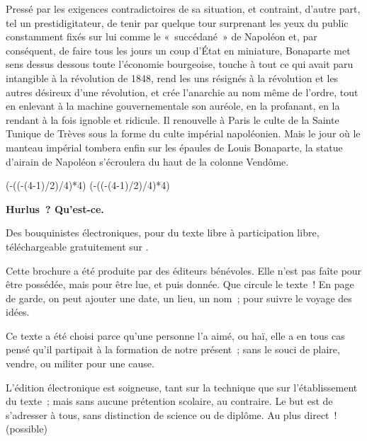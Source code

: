 \documentclass[french,twoside]{book} %
\newcommand\chapterclose{} %
\def\truncdiv#1#2{((#1-(#2-1)/2)/#2)}
\def\moduloop#1#2{(#1-\truncdiv{#1}{#2}*#2)}
\def\modulo#1#2{\number\numexpr\moduloop{#1}{#2}\relax}
\begin{document}
Pressé par les exigences contradictoires de sa situation, et contraint, d’autre part, tel un prestidigitateur, de tenir par quelque tour surprenant les yeux du public constamment fixés sur lui comme le « succédané » de Napoléon et, par conséquent, de faire tous les jours un coup d’État en miniature, Bonaparte met sens dessus dessous toute l’économie bourgeoise, touche à tout ce qui avait paru intangible à la révolution de 1848, rend les uns résignés à la révolution et les autres désireux d’une révolution, et crée l’anarchie au nom même de l’ordre, tout en enlevant à la machine gouvernementale son auréole, en la profanant, en la rendant à la fois ignoble et ridicule. Il renouvelle à Paris le culte de la Sainte Tunique de Trèves sous la forme du culte impérial napoléonien. Mais le jour où le manteau impérial tombera enfin sur les épaules de Louis Bonaparte, la statue d’airain de Napoléon s’écroulera du haut de la colonne Vendôme.
\chapterclose

 


\ifbooklet
  \pagestyle{empty}
  \clearpage
  \ifnum\modulo{\value{page}}{4}=0 \hbox{}\newpage\hbox{}\newpage\fi
  \ifnum\modulo{\value{page}}{4}=1 \hbox{}\newpage\hbox{}\newpage\fi


  \hbox{}\newpage
  \ifodd\value{page}\hbox{}\newpage\fi
  {\centering\color{rubric}\bfseries\noindent\large
    Hurlus ? Qu’est-ce.\par
    \bigskip
  }
  \noindent Des bouquinistes électroniques, pour du texte libre à participation libre,
  téléchargeable gratuitement sur \href{https://hurlus.fr}{}.\par
  \bigskip
  \noindent Cette brochure a été produite par des éditeurs bénévoles.
  Elle n’est pas faîte pour être possédée, mais pour être lue, et puis donnée.
  Que circule le texte !
  En page de garde, on peut ajouter une date, un lieu, un nom ; pour suivre le voyage des idées.
  \par

  Ce texte a été choisi parce qu’une personne l’a aimé,
  ou haï, elle a en tous cas pensé qu’il partipait à la formation de notre présent ;
  sans le souci de plaire, vendre, ou militer pour une cause.
  \par

  L’édition électronique est soigneuse, tant sur la technique
  que sur l’établissement du texte ; mais sans aucune prétention scolaire, au contraire.
  Le but est de s’adresser à tous, sans distinction de science ou de diplôme.
  Au plus direct ! (possible)
  \par
\end{document}
